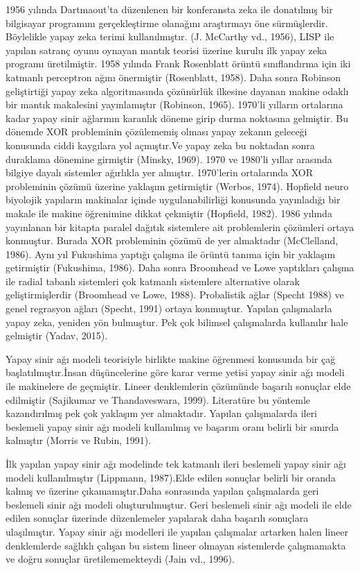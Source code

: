 \documentclass{article}
\begin{document}
\newpage
\begin{multicols}{2}
    1956 yılında Dartmaout’ta düzenlenen bir
konferansta zeka ile donatılmış bir bilgisayar
programını gerçekleştirme olanağını araştırmayı
öne sürmüşlerdir. Böylelikle yapay zeka terimi
kullanılmıştır. (J. McCarthy vd., 1956), LISP ile
yapılan satranç oyunu oynayan mantık teorisi
üzerine kurulu ilk yapay zeka programı
üretilmiştir. 1958 yılında Frank Rosenblatt
örüntü sınıflandırma için iki katmanlı perceptron
ağını önermiştir (Rosenblatt, 1958). Daha sonra
Robinson geliştirtiği yapay zeka algoritmasında
çözünürlük ilkesine dayanan makine odaklı bir
mantık makalesini yayınlamıştır (Robinson,
1965). 1970’li yılların ortalarına kadar yapay
sinir ağlarının karanlık döneme girip durma
noktasına gelmiştir. Bu dönemde XOR
probleminin çözülememiş olması yapay zekanın
geleceği konusunda ciddi kaygılara yol açmıştır.Ve yapay zeka bu noktadan sonra duraklama
dönemine girmiştir (Minsky, 1969). 1970 ve
1980’li yıllar arasında bilgiye dayalı sistemler
ağırlıkla yer almıştır. 1970’lerin ortalarında XOR
probleminin çözümü üzerine yaklaşım
getirmiştir (Werbos, 1974). Hopfield neuro
biyolojik yapıların makinalar içinde
uygulanabilirliği konusunda yayınladığı bir
makale ile makine öğrenimine dikkat çekmiştir
(Hopfield, 1982). 1986 yılında yayınlanan bir
kitapta paralel dağıtık sistemlere ait problemlerin
çözümleri ortaya konmuştur. Burada XOR
probleminin çözümü de yer almaktadır
(McClelland, 1986). Aynı yıl Fukushima yaptığı
çalışma ile örüntü tanıma için bir yaklaşım
getirmiştir (Fukushima, 1986). Daha sonra
Broomhead ve Lowe yaptıkları çalışma ile radial
tabanlı sistemleri çok katmanlı sistemlere
alternative olarak geliştirmişlerdir (Broomhead ve Lowe, 1988). Probalistik ağlar (Specht 1988)
ve genel regrasyon ağları (Specht, 1991) ortaya
konmuştur. Yapılan çalışmalarla yapay zeka,
yeniden yön bulmuştur. Pek çok bilimsel
çalışmalarda kullanılır hale gelmiştir (Yadav,
2015).
\vspace{10pt}

Yapay sinir ağı modeli teorisiyle birlikte makine öğrenmesi konusunda bir çağ başlatılmıştır.İnsan düşüncelerine göre karar verme yetisi
yapay sinir ağı modeli ile makinelere de
geçmiştir. Lineer denklemlerin çözümünde
başarılı sonuçlar elde edilmiştir (Sajikumar ve
Thandaveswara, 1999). Literatüre bu yöntemle
kazandırılmış pek çok yaklaşım yer almaktadır.
Yapılan çalışmalarda ileri beslemeli yapay sinir
ağı modeli kullanılmış ve başarım oranı belirli bir
sınırda kalmıştır (Morris ve Rubin, 1991). 
\vspace{10pt}

İlk yapılan yapay sinir ağı modelinde tek
katmanlı ileri beslemeli yapay sinir ağı modeli
kullanılmıştır (Lippmann, 1987).Elde edilen
sonuçlar belirli bir oranda kalmış ve üzerine
çıkamamıştır.Daha sonrasında yapılan
çalışmalarda geri beslemeli sinir ağı modeli
oluşturulmuştur. Geri beslemeli sinir ağı modeli
ile elde edilen sonuçlar üzerinde düzenlemeler
yapılarak daha başarılı sonuçlara ulaşılmıştır.
Yapay sinir ağı modelleri ile yapılan çalışmalar
artarken halen lineer denklemlerde sağlıklı
çalışan bu sistem lineer olmayan sistemlerde
çalışmamakta ve doğru sonuçlar
üretilememekteydi (Jain vd., 1996). 
\end{multicols}
\end{document}

